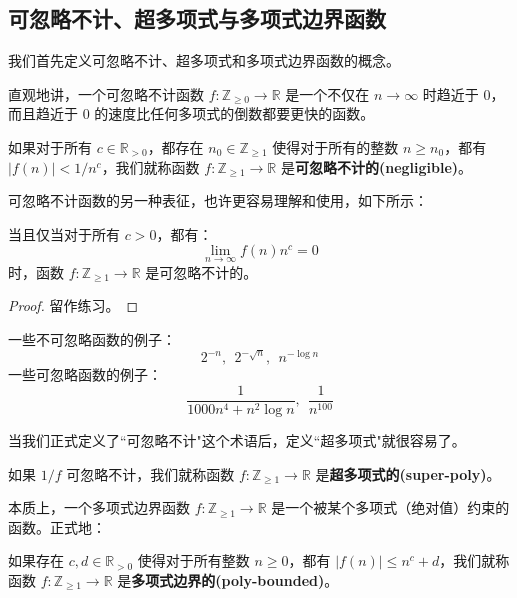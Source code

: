 \subsection{可忽略不计、超多项式与多项式边界函数}

我们首先定义可忽略不计、超多项式和多项式边界函数的概念。

直观地讲，一个可忽略不计函数 $f:\mathbb{Z}_{\geq0}\to\mathbb{R}$ 是一个不仅在 $n\to\infty$ 时趋近于 $0$，而且趋近于 $0$ 的速度比任何多项式的倒数都要更快的函数。

\begin{definition}\label{def:2-5}
如果对于所有 $c\in\mathbb{R}_{>0}$，都存在 $n_0\in\mathbb{Z}_{\geq 1}$ 使得对于所有的整数 $n\geq n_0$，都有 $|f(n)|<{1}/{n^c}$，我们就称函数 $f:\mathbb{Z}_{\geq1}\to\mathbb{R}$ 是\textbf{可忽略不计的(negligible)}。
\end{definition}

可忽略不计函数的另一种表征，也许更容易理解和使用，如下所示：

\begin{theorem}
当且仅当对于所有 $c>0$，都有：
$$
\lim_{n\to\infty}f(n)n^c=0
$$
时，函数 $f:\mathbb{Z}_{\geq1}\to\mathbb{R}$ 是可忽略不计的。
\end{theorem}

\begin{proof}
留作练习。
\end{proof}

\begin{example}
一些不可忽略函数的例子：
$$
2^{-n},~~2^{-\sqrt{n}},~~n^{-\log n}
$$
一些可忽略函数的例子：
$$
\frac{1}{1000n^4+n^2\log n},~~\frac{1}{n^{100}}
$$
\end{example}

当我们正式定义了``可忽略不计"这个术语后，定义``超多项式"就很容易了。

\begin{definition}
如果 ${1}/{f}$ 可忽略不计，我们就称函数 $f:\mathbb{Z}_{\geq1}\to\mathbb{R}$ 是\textbf{超多项式的(super-poly)}。
\end{definition}

本质上，一个多项式边界函数 $f:\mathbb{Z}_{\geq1}\to\mathbb{R}$ 是一个被某个多项式（绝对值）约束的函数。正式地：

\begin{definition}
如果存在 $c,d\in\mathbb{R}_{>0}$ 使得对于所有整数 $n\geq0$，都有 $|f(n)|\leq n^c+d$，我们就称函数 $f:\mathbb{Z}_{\geq1}\to\mathbb{R}$ 是\textbf{多项式边界的(poly-bounded)}。
\end{definition}

